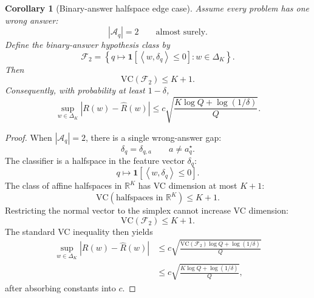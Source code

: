 \documentclass{article} %
\newtheorem{corollary}[theorem]{Corollary}
\providecommand{\Aq}{\mathcal{A}_q}
\providecommand{\simplex}{\Delta_K}
\providecommand{\Risk}{R}
\providecommand{\Fcal}{\mathcal{F}}
\providecommand{\VC}{\mathrm{VC}}
\begin{document}
\begin{corollary}[Binary-answer halfspace edge case]
\label{cor:app4-halfspace}
Assume every problem has one wrong answer:
\begin{equation}
\label{eq:app4-binary-A}
|\Aq|=2
\qquad
\text{almost surely}.
\end{equation}
Define the binary-answer hypothesis class by
\begin{equation}
\label{eq:app4-F2}
\Fcal_2
=
\left\{
q\mapsto
\mathbf 1\!\left[
\left\langle w,\delta_q\right\rangle\le 0
\right]
:
w\in\simplex
\right\}.
\end{equation}
Then
\begin{equation}
\label{eq:app4-vc-halfspace}
\VC(\Fcal_2)
\le
K+1.
\end{equation}
Consequently, with probability at least \(1-\delta\),
\begin{equation}
\label{eq:app4-halfspace-bound}
\sup_{w\in\simplex}
\left|
\Risk(w)-\widehat{\Risk}(w)
\right|
\le
c
\sqrt{
\frac{
K\log Q+\log(1/\delta)
}{
Q
}
}.
\end{equation}
\end{corollary}

\begin{proof}
When \(|\Aq|=2\), there is a single wrong-answer gap:
\begin{equation}
\label{eq:app4-single-gap}
\delta_q
=
\delta_{q,a}
\qquad
a\ne a_q^\star .
\end{equation}
The classifier is a halfspace in the feature vector \(\delta_q\):
\begin{equation}
\label{eq:app4-halfspace-form}
q
\mapsto
\mathbf 1\!\left[
\left\langle w,\delta_q\right\rangle\le 0
\right].
\end{equation}
The class of affine halfspaces in \(\mathbb{R}^K\) has VC dimension at most \(K+1\):
\begin{equation}
\label{eq:app4-vc-affine}
\VC(\text{halfspaces in }\mathbb{R}^K)
\le
K+1.
\end{equation}
Restricting the normal vector to the simplex cannot increase VC dimension:
\begin{equation}
\label{eq:app4-restrict-vc}
\VC(\Fcal_2)
\le
K+1.
\end{equation}
The standard VC inequality then yields
\begin{align}
\sup_{w\in\simplex}
\left|
\Risk(w)-\widehat{\Risk}(w)
\right|
&\le
c
\sqrt{
\frac{
\VC(\Fcal_2)\log Q+\log(1/\delta)
}{
Q
}
}
\label{eq:app4-halfspace-proof-a}
\\
&\le
c
\sqrt{
\frac{
K\log Q+\log(1/\delta)
}{
Q
}
},
\label{eq:app4-halfspace-proof-b}
\end{align}
after absorbing constants into \(c\).
\end{proof}
\end{document}

